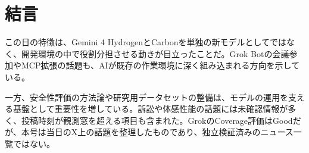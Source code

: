 \section{結言}
この日の特徴は、Gemini 4 HydrogenとCarbonを単独の新モデルとしてではなく、開発環境の中で役割分担させる動きが目立ったことだ。Grok Botの会議参加やMCP拡張の話題も、AIが既存の作業環境に深く組み込まれる方向を示している。

一方、安全性評価の方法論や研究用データセットの整備は、モデルの運用を支える基盤として重要性を増している。訴訟や体感性能の話題には未確認情報が多く、投稿時刻が観測窓を超える項目も含まれた。GrokのCoverage評価はGoodだが、本号は当日のX上の話題を整理したものであり、独立検証済みのニュース一覧ではない。